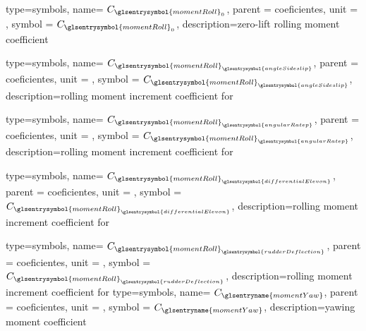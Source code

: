 {type=symbols,
    name= \ensuremath{C_{\glsentrysymbol{momentRoll}_{0}}},
    parent = {coeficientes},
    unit = \unexpanded{},
    symbol = \ensuremath{C_{\glsentrysymbol{momentRoll}_{0}}},
    description={zero-lift rolling moment coefficient}
}

{type=symbols,
    name= \ensuremath{C_{{\glsentrysymbol{momentRoll}}_{\glsentrysymbol{angleSideslip}}}},
    parent = {coeficientes},
    unit = \unexpanded{},
    symbol = \ensuremath{C_{{\glsentrysymbol{momentRoll}}_{\glsentrysymbol{angleSideslip}}}},
    description={rolling moment increment coefficient for }
}

{type=symbols,
    name= \ensuremath{C_{{\glsentrysymbol{momentRoll}}_{\glsentrysymbol{angularRatep}}}},
    parent = {coeficientes},
    unit = \unexpanded{},
    symbol = \ensuremath{C_{{\glsentrysymbol{momentRoll}}_{\glsentrysymbol{angularRatep}}}},
    description={rolling moment increment coefficient for }
}

{type=symbols,
    name= \ensuremath{C_{{\glsentrysymbol{momentRoll}}_{\glsentrysymbol{differentialElevon}}}},
    parent = {coeficientes},
    unit = \unexpanded{},
    symbol = \ensuremath{C_{{\glsentrysymbol{momentRoll}}_{\glsentrysymbol{differentialElevon}}}},
    description={rolling moment increment coefficient for }
}

{type=symbols,
    name= \ensuremath{C_{{\glsentrysymbol{momentRoll}}_{\glsentrysymbol{rudderDeflection}}}},
    parent = {coeficientes},
    unit = \unexpanded{},
    symbol = \ensuremath{C_{{\glsentrysymbol{momentRoll}}_{\glsentrysymbol{rudderDeflection}}}},
    description={rolling moment increment coefficient for }
}
{type=symbols,
    name= \ensuremath{C_\glsentryname{momentYaw}},
    parent = {coeficientes},
    unit = \unexpanded{},
    symbol = \ensuremath{C_\glsentryname{momentYaw}},
    description={yawing moment coefficient}
}

